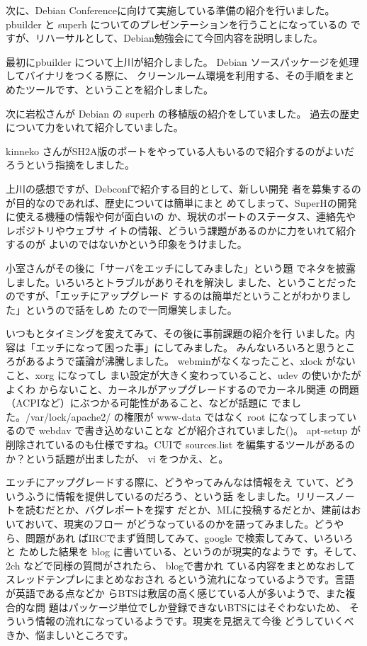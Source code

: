 \documentclass[mingoth,a4paper]{jsarticle}
\begin{document}
次に、Debian Conferenceに向けて実施している準備の紹介を行いました。
pbuilder と superh についてのプレゼンテーションを行うことになっているの
ですが、リハーサルとして、Debian勉強会にて今回内容を説明しました。

最初にpbuilder について上川が紹介しました。
Debian ソースパッケージを処理してバイナリをつくる際に、
クリーンルーム環境を利用する、その手順をまとめたツールです、ということを紹介しました。


次に岩松さんが Debian の superh の移植版の紹介をしていました。
過去の歴史について力をいれて紹介していました。

kinneko さんがSH2A版のポートをやっている人もいるので紹介するのがよいだろうという指摘をしました。

上川の感想ですが、Debconfで紹介する目的として、新しい開発
者を募集するのが目的なのであれば、歴史については簡単にまと
めてしまって、SuperHの開発に使える機種の情報や何が面白いの
か、現状のポートのステータス、連絡先やレポジトリやウェブサ
イトの情報、どういう課題があるのかに力をいれて紹介するのが
よいのではないかという印象をうけました。

小室さんがその後に「サーバをエッチにしてみました」という題
でネタを披露しました。いろいろとトラブルがありそれを解決し
ました、ということだったのですが、「エッチにアップグレード
するのは簡単だということがわかりました」というので話をしめ
たので一同爆笑しました。


いつもとタイミングを変えてみて、その後に事前課題の紹介を行
いました。内容は「エッチになって困った事」にしてみました。
みんないろいろと思うところがあるようで議論が沸騰しました。
webminがなくなったこと、xlock がないこと、xorg になってし
まい設定が大きく変わっていること、udev の使いかたがよくわ
からないこと、カーネルがアップグレードするのでカーネル関連
の問題（ACPIなど）にぶつかる可能性があること、などが話題に
でました。/var/lock/apache2/ の権限が www-data ではなく 
root になってしまっているので webdav で書き込めないことな
どが紹介されていました()。
apt-setup が削除されているのも仕様ですね。CUIで sources.list を編集するツールがあるのか？という話題が出ましたが、 vi をつかえ、と。

エッチにアップグレードする際に、どうやってみんなは情報をえ
ていて、どういうふうに情報を提供しているのだろう、という話
をしました。リリースノートを読むだとか、バグレポートを探す
だとか、MLに投稿するだとか、建前はおいておいて、現実のフロー
がどうなっているのかを語ってみました。どうやら、問題があれ
ばIRCでまず質問してみて、google で検索してみて、いろいろと
ためした結果を blog に書いている、というのが現実的なようで
す。そして、2ch などで同様の質問がされたら、 blogで書かれ
ている内容をまとめなおしてスレッドテンプレにまとめなおされ
るという流れになっているようです。言語が英語である点などか
らBTSは敷居の高く感じている人が多いようで、また複合的な問
題はパッケージ単位でしか登録できないBTSにはそぐわないため、
そういう情報の流れになっているようです。現実を見据えて今後
どうしていくべきか、悩ましいところです。
\end{document}
